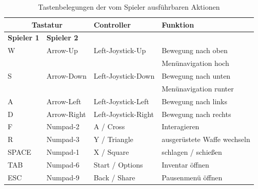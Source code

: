 \begin{table}[h!]
    \centering
    \begin{tabular}{|l|l|l|l|}
        \hline
        \multicolumn{2}{|c|}{\textbf{Tastatur}} & \textbf{Controller} & \textbf{Funktion} \\
        \hline
        \textbf{Spieler 1} & \textbf{Spieler 2} & & \\
        \hline
        W & Arrow-Up & Left-Joystick-Up & Bewegung nach oben \\&&& Menünavigation hoch \\
        \hline
        S & Arrow-Down & Left-Joystick-Down & Bewegung nach unten \\&&& Menünavigation runter \\
        \hline
        A & Arrow-Left & Left-Joystick-Left & Bewegung nach links \\
        \hline
        D & Arrow-Right & Left-Joystick-Right & Bewegung nach rechts \\
        \hline
        F & Numpad-2 & A / Cross & Interagieren \\
        \hline
        R & Numpad-3 & Y / Triangle & ausgerüstete Waffe wechseln \\
        \hline
        SPACE & Numpad-1 & X / Square & schlagen / schießen \\
        \hline
        TAB & Numpad-6 & Start / Options & Inventar öffnen \\
        \hline
        ESC & Numpad-9 & Back / Share & Pausenmenü öffnen \\
        \hline
    \end{tabular}
    \caption{Tastenbelegungen der vom Spieler ausführbaren Aktionen}
    \label{tab:steuerung}
\end{table}

